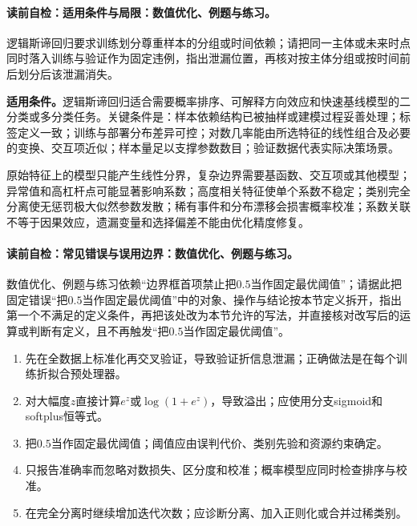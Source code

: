 \label{struct:V2-C05-CH28}
\paragraph{读前自检：适用条件与局限：数值优化、例题与练习。}逻辑斯谛回归要求训练划分尊重样本的分组或时间依赖；请把同一主体或未来时点同时落入训练与验证作为固定违例，指出泄漏位置，再核对按主体分组或按时间前后划分后该泄漏消失。\par

\begin{applicabilitybox}
\textbf{适用条件。}逻辑斯谛回归适合需要概率排序、可解释方向效应和快速基线模型的二分类或多分类任务。关键条件是：样本依赖结构已被抽样或建模过程妥善处理；标签定义一致；训练与部署分布差异可控；对数几率能由所选特征的线性组合及必要的变换、交互项近似；样本量足以支撑参数数目；验证数据代表实际决策场景。
\end{applicabilitybox}

\label{struct:V2-C05-CH29}
\begin{notapplicablebox}[title=\SLMethodLimitationsTitle]
原始特征上的模型只能产生线性分界，复杂边界需要基函数、交互项或其他模型；异常值和高杠杆点可能显著影响系数；高度相关特征使单个系数不稳定；类别完全分离使无惩罚极大似然参数发散；稀有事件和分布漂移会损害概率校准；系数关联不等于因果效应，遗漏变量和选择偏差不能由优化精度修复。
\end{notapplicablebox}

\label{struct:V2-C05-CH30}
\paragraph{读前自检：常见错误与误用边界：数值优化、例题与练习。}数值优化、例题与练习依赖“边界框首项禁止把$0.5$当作固定最优阈值”；请据此把固定错误“把$0.5$当作固定最优阈值”中的对象、操作与结论按本节定义拆开，指出第一个不满足的定义条件，再把该处改为本节允许的写法，并直接核对改写后的运算或判断有定义，且不再触发“把$0.5$当作固定最优阈值”。\par

\begin{warningbox}
\begin{enumerate}[leftmargin=2.2em]
  \item 先在全数据上标准化再交叉验证，导致验证折信息泄漏；正确做法是在每个训练折拟合预处理器。
  \item 对大幅度$z$直接计算$e^z$或$\log(1+e^z)$，导致溢出；应使用分支sigmoid和softplus恒等式。
  \item 把$0.5$当作固定最优阈值；阈值应由误判代价、类别先验和资源约束确定。
  \item 只报告准确率而忽略对数损失、区分度和校准；概率模型应同时检查排序与校准。
  \item 在完全分离时继续增加迭代次数；应诊断分离、加入正则化或合并过稀类别。
\end{enumerate}
\end{warningbox}

